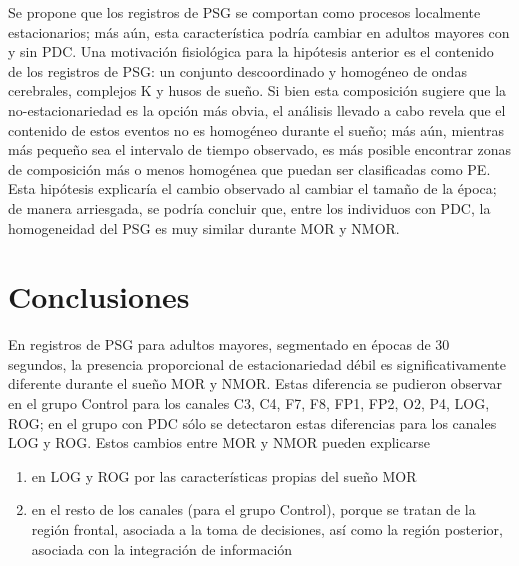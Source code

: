 \documentclass[12pt,a4paper]{mitthesis}
\begin{document}
Se propone que los registros de PSG se comportan como procesos localmente estacionarios; m\'as 
a\'un, esta caracter\'istica podr\'ia cambiar en adultos mayores con y sin PDC. 
Una motivaci\'on fisiol\'ogica para la hip\'otesis anterior es el contenido de los registros de
PSG: un conjunto descoordinado y homog\'eneo de ondas cerebrales, complejos K y husos de sue\~no.
Si bien esta composici\'on sugiere que la no-estacionariedad es la opci\'on m\'as obvia, el
an\'alisis llevado a cabo revela que el contenido de estos eventos no es homog\'eneo durante el
sue\~no; m\'as a\'un, mientras m\'as peque\~no sea el intervalo de tiempo observado, es m\'as
posible encontrar zonas de composici\'on m\'as o menos homog\'enea que puedan ser clasificadas
como PE.
Esta hip\'otesis explicar\'ia el cambio observado al cambiar el tama\~no de la \'epoca; de manera
arriesgada, se podr\'ia concluir que, entre los individuos con PDC, la homogeneidad del PSG es muy
similar durante MOR y NMOR.


\section{Conclusiones}

En registros de PSG para adultos mayores, segmentado en \'epocas de 30 segundos, la presencia 
proporcional de estacionariedad d\'ebil es significativamente diferente durante el sue\~no MOR y 
NMOR.
Estas diferencia se pudieron observar en el grupo Control para los canales C3, C4, F7, F8, FP1, 
FP2, O2, P4, LOG, ROG; en el grupo con PDC s\'olo se detectaron estas diferencias para los canales 
LOG y ROG.
Estos cambios entre MOR y NMOR pueden explicarse 
\begin{enumerate}
\item en LOG y ROG por las caracter\'isticas propias  del sue\~no MOR
\item en el resto de los canales (para el grupo Control), porque se tratan de la 
regi\'on frontal, asociada a la toma de decisiones, as\'i como la regi\'on posterior, 
asociada con la integraci\'on
de informaci\'on
\end{enumerate}
\end{document}
